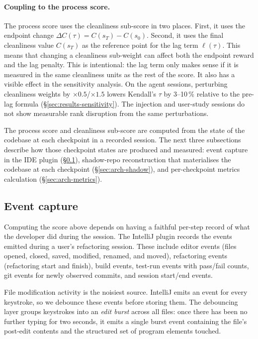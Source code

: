 \paragraph{Coupling to the process score.}
The process score uses the cleanliness sub-score in two places. First, it uses the endpoint change $\Delta C(\tau) = C(s_T) - C(s_0)$. Second, it uses the final cleanliness value $C(s_T)$ as the reference point for the lag term $\ell(\tau)$. This means that changing a cleanliness sub-weight can affect both the endpoint reward and the lag penalty. This is intentional: the lag term only makes sense if it is measured in the same cleanliness units as the rest of the score. It also has a visible effect in the sensitivity analysis. On the agent sessions, perturbing cleanliness weights by $\times 0.5$/$\times 1.5$ lowers Kendall's $\tau$ by 3--10\,\% relative to the pre-lag formula (\S\ref{sec:results-sensitivity}). The injection and user-study sessions do not show measurable rank disruption from the same perturbations.

The process score and cleanliness sub-score are computed from the state of the codebase at each checkpoint in a recorded session. The next three subsections describe how those checkpoint states are produced and measured: event capture in the IDE plugin (\S\ref{sec:arch-events}), shadow-repo reconstruction that materialises the codebase at each checkpoint (\S\ref{sec:arch-shadow}), and per-checkpoint metrics calculation (\S\ref{sec:arch-metrics}).

\subsection{Event capture}
\label{sec:arch-events}

Computing the score above depends on having a faithful per-step record of what the developer did during the session. The IntelliJ plugin records the events emitted during a user's refactoring session. These include editor events (files opened, closed, saved, modified, renamed, and moved), refactoring events (refactoring start and finish), build events, test-run events with pass/fail counts, git events for newly observed commits, and session start/end events.

File modification activity is the noisiest source. IntelliJ emits an event for every keystroke, so we debounce these events before storing them. The debouncing layer groups keystrokes into an \emph{edit burst} across all files: once there has been no further typing for two seconds, it emits a single burst event containing the file's post-edit contents and the structured set of program elements touched.

